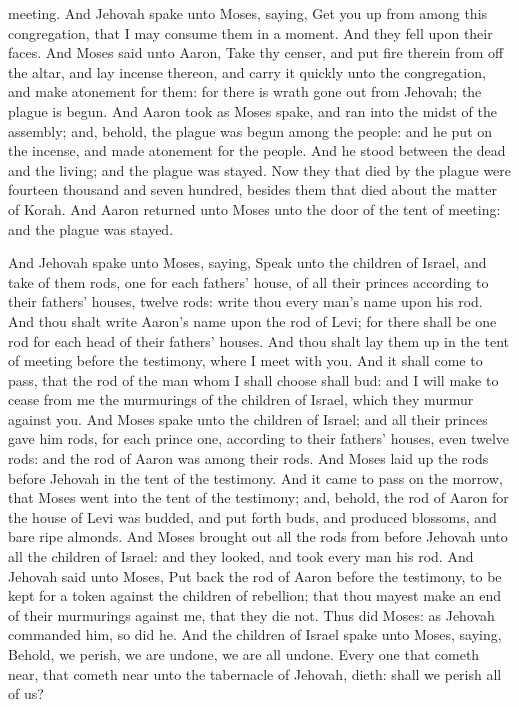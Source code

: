 meeting. And Jehovah spake unto Moses, saying, Get you up from among this congregation, that I may consume them in a moment. And they fell upon their faces. And Moses said unto Aaron, Take thy censer, and put fire therein from off the altar, and lay incense thereon, and carry it quickly unto the congregation, and make atonement for them: for there is wrath gone out from Jehovah; the plague is begun. And Aaron took as Moses spake, and ran into the midst of the assembly; and, behold, the plague was begun among the people: and he put on the incense, and made atonement for the people. And he stood between the dead and the living; and the plague was stayed. Now they that died by the plague were fourteen thousand and seven hundred, besides them that died about the matter of Korah. And Aaron returned unto Moses unto the door of the tent of meeting: and the plague was stayed. 

And Jehovah spake unto Moses, saying, Speak unto the children of Israel, and take of them rods, one for each fathers’ house, of all their princes according to their fathers’ houses, twelve rods: write thou every man’s name upon his rod. And thou shalt write Aaron’s name upon the rod of Levi; for there shall be one rod for each head of their fathers’ houses. And thou shalt lay them up in the tent of meeting before the testimony, where I meet with you. And it shall come to pass, that the rod of the man whom I shall choose shall bud: and I will make to cease from me the murmurings of the children of Israel, which they murmur against you. And Moses spake unto the children of Israel; and all their princes gave him rods, for each prince one, according to their fathers’ houses, even twelve rods: and the rod of Aaron was among their rods. And Moses laid up the rods before Jehovah in the tent of the testimony.  And it came to pass on the morrow, that Moses went into the tent of the testimony; and, behold, the rod of Aaron for the house of Levi was budded, and put forth buds, and produced blossoms, and bare ripe almonds. And Moses brought out all the rods from before Jehovah unto all the children of Israel: and they looked, and took every man his rod. And Jehovah said unto Moses, Put back the rod of Aaron before the testimony, to be kept for a token against the children of rebellion; that thou mayest make an end of their murmurings against me, that they die not. Thus did Moses: as Jehovah commanded him, so did he.  And the children of Israel spake unto Moses, saying, Behold, we perish, we are undone, we are all undone. Every one that cometh near, that cometh near unto the tabernacle of Jehovah, dieth: shall we perish all of us? 

